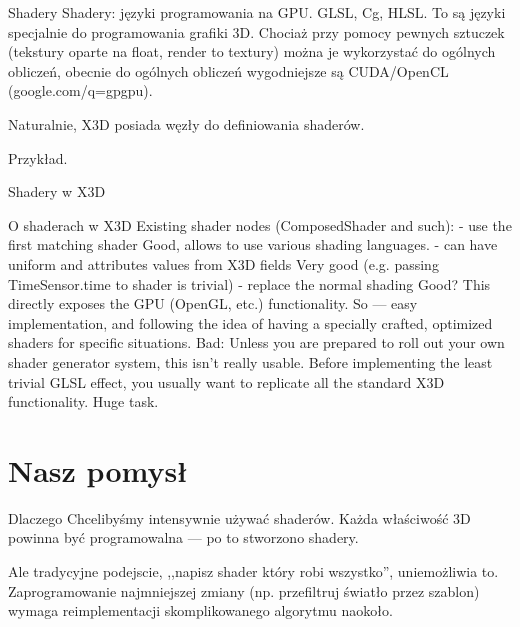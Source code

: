 \documentclass{beamer}
\begin{document}
\begin{frame}{Shadery}
Shadery: języki programowania na GPU. GLSL, Cg, HLSL. To są języki specjalnie do programowania grafiki 3D. Chociaż przy pomocy pewnych sztuczek (tekstury oparte na float, render to textury) można je wykorzystać do ogólnych obliczeń, obecnie do ogólnych obliczeń wygodniejsze są CUDA/OpenCL (google.com/q=gpgpu).

Naturalnie, X3D posiada węzły do definiowania shaderów.

Przykład.
\end{frame}

\begin{frame}{Shadery w X3D}
\end{frame}

\begin{frame}{O shaderach w X3D}
  Existing shader nodes (ComposedShader and such):
    - use the first matching shader
      Good, allows to use various shading languages.
    - can have uniform and attributes values from X3D fields
      Very good (e.g. passing TimeSensor.time to shader is trivial)
    - replace the normal shading
      Good? This directly exposes the GPU (OpenGL, etc.)
        functionality. So --- easy implementation, and following the idea
        of having a specially crafted, optimized shaders for specific
        situations.
      Bad: Unless you are prepared to roll out your own shader generator
        system, this isn't really usable. Before implementing the least
        trivial GLSL effect, you usually want to replicate all the standard
        X3D functionality. Huge task.
\end{frame}

\section{Nasz pomysł}

\begin{frame}{Dlaczego}
Chcelibyśmy intensywnie używać shaderów. Każda właściwość 3D powinna
być programowalna --- po to stworzono shadery.

Ale tradycyjne podejscie, ,,napisz shader który robi wszystko'',
uniemożliwia to. Zaprogramowanie najmniejszej zmiany (np. przefiltruj
światło przez szablon) wymaga reimplementacji skomplikowanego algorytmu naokoło.
\end{frame}
\end{document}
